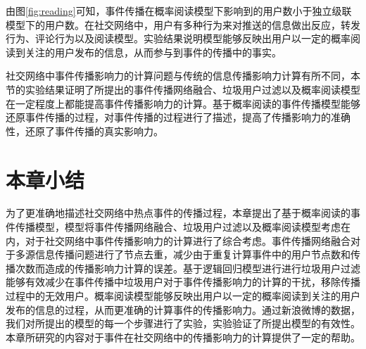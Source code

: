 由图\ref{fig:reading}可知，事件传播在概率阅读模型下影响到的用户数小于独立级联模型下的用户数。在社交网络中，用户有多种行为来对推送的信息做出反应，转发行为、评论行为以及阅读模型。实验结果说明模型能够反映出用户以一定的概率阅读到关注的用户发布的信息，从而参与到事件的传播中的事实。

社交网络中事件传播影响力的计算问题与传统的信息传播影响力计算有所不同，本节的实验结果证明了所提出的事件传播网络融合、垃圾用户过滤以及概率阅读模型在一定程度上都能提高事件传播影响力的计算。基于概率阅读的事件传播模型能够还原事件传播的过程，对事件传播的过程进行了描述，提高了传播影响力的准确性，还原了事件传播的真实影响力。

\section{本章小结}
\label{sec5:conclusion}
为了更准确地描述社交网络中热点事件的传播过程，本章提出了基于概率阅读的事件传播模型，模型将事件传播网络融合、垃圾用户过滤以及概率阅读模型考虑在内，对于社交网络中事件传播影响力的计算进行了综合考虑。事件传播网络融合对于多源信息传播问题进行了节点去重，减少由于重复计算事件中的用户节点数和传播次数而造成的传播影响力计算的误差。基于逻辑回归模型进行进行垃圾用户过滤能够有效减少在事件传播中垃圾用户对于事件传播影响力的计算的干扰，移除传播过程中的无效用户。概率阅读模型能够反映出用户以一定的概率阅读到关注的用户发布的信息的过程，从而更准确的计算事件的传播影响力。通过新浪微博的数据，我们对所提出的模型的每一个步骤进行了实验，实验验证了所提出模型的有效性。本章所研究的内容对于事件在社交网络中的传播影响力的计算提供了一定的帮助。